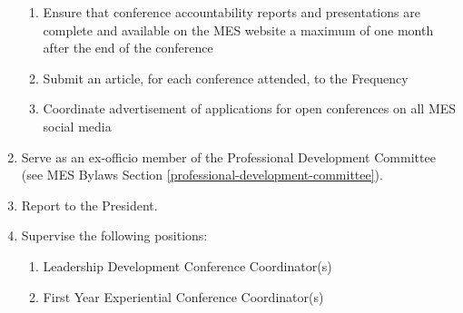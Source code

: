 \begin{enumerate}
  \begin{enumerate}
   \item
    Ensure that conference accountability reports and presentations are complete and available on the MES website a maximum of one month after the end of the conference
   \item
    Submit an article, for each conference attended, to the Frequency
   \item
    Coordinate advertisement of applications for open conferences on all MES social media
  \end{enumerate}
 \item
  Serve as an ex-officio member of the Professional Development Committee (see MES Bylaws Section \ref{professional-development-committee}).
 \item
  Report to the President.
 \item
  Supervise the following positions:

  \begin{enumerate}
   \item
    Leadership Development Conference Coordinator(s)
   \item
    First Year Experiential Conference Coordinator(s)

  \end{enumerate}
\end{enumerate}